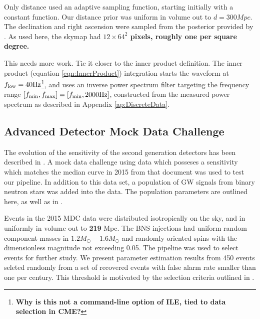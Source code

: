 Only distance used an adaptive sampling function, starting initially with a constant function. Our distance prior was uniform in volume out to $d=300\unit{Mpc}$. The declination and right ascension were sampled from the posterior provided by \BS. As used here, the skymap had \textbf{$12\times 64^2$ pixels, roughly one per square degree.}

{\color{blue} This needs more work. Tie it closer to the inner product definition.}
The inner product (equation \ref{eqn:InnerProduct}) integration starts the waveform at $f_{\rm low}=40{\rm Hz}$\footnote{ \textbf{Why is this not a command-line option of ILE, tied to data selection in CME?}}, and uses an inverse power spectrum filter targeting the frequency range $[f_{\rm min},f_{\rm max}]=[f_{\rm min}, 2000{\rm Hz}]$, constructed from the measured power spectrum as described in Appendix \ref{ap:DiscreteData}.  

\subsection{Advanced Detector Mock Data Challenge}
\label{sec:BNS_2015_MDC}

The evolution of the sensitivity of the second generation detectors has been described in \cite{LIGO-Inspiral-Rates,LIGO-2013-WhitePaper-CoordinatedEMObserving}. A mock data challenge using data which posseses a sensitivity which matches the median curve in 2015 from that document was used to test our pipeline. In addition to this data set, a population of GW signals from binary neutron stars was added into the data. The population parameters are outlined here, as well as in \cite{first2years}.

Events in the 2015 MDC data were distributed isotropically on the sky, and in uniformly in volume out to \textbf{219} \unit{Mpc}. The BNS injections had uniform random component masses in $1.2 M_\odot-1.6 M_\odot$ and randomly oriented spins with the dimensionless magnitude not exceeding 0.05. The \gstlal{} pipeline was used to select events for further study. We present parameter estimation results from 450 events seleted randomly from a set of recovered events with false alarm rate smaller than one per century. This threshold is motivated by the selection criteria outlined in \cite{LIGO-2013-WhitePaper-CoordinatedEMObserving}.


